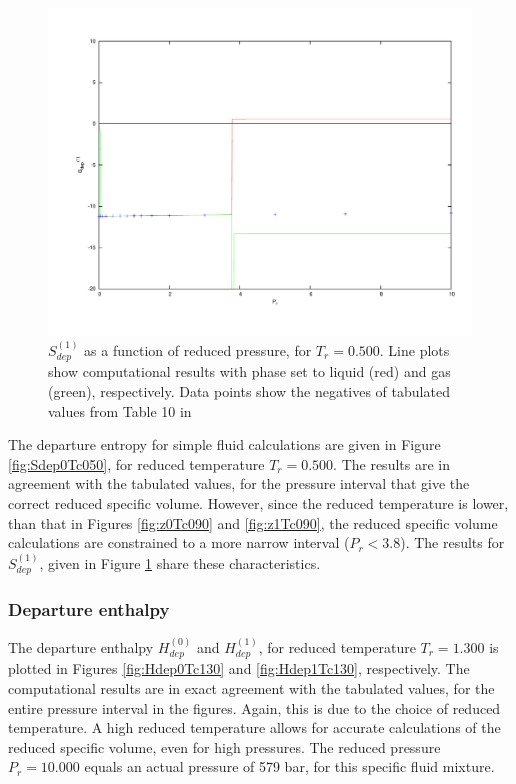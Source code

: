 \documentclass[internal,english]{sintefmemo2012}
\numberwithin{equation}{section}
\begin{document}
\begin{figure}
	\centering
	\includegraphics[trim = 1.5cm 2cm 0 1cm, clip = true, width=14cm]{Sdep1Tc050}
	\caption{$S_{dep}^{(1)}$ as a function of reduced pressure, for $T_r = 0.500$. Line plots show computational results with phase set to liquid (red) and gas (green), respectively. Data points show the negatives of tabulated values from Table 10 in \cite{LK}}
	\label{fig:Sdep1Tc050}
\end{figure}

The departure entropy for simple fluid calculations are given in Figure \ref{fig:Sdep0Tc050}, for reduced temperature $T_r = 0.500$. The results are in agreement with the tabulated values, for the pressure interval that give the correct reduced specific volume. However, since the reduced temperature is lower, than that in Figures \ref{fig:z0Tc090} and \ref{fig:z1Tc090}, the reduced specific volume calculations are constrained to a more narrow interval ($P_r < 3.8$). The results for $S_{dep} ^{(1)}$, given in Figure \ref{fig:Sdep1Tc050} share these characteristics.

\subsubsection*{Departure enthalpy}
The departure enthalpy $H_{dep}^{(0)}$ and  $H_{dep}^{(1)}$, for reduced temperature $T_r = 1.300$ is plotted in Figures \ref{fig:Hdep0Tc130} and \ref{fig:Hdep1Tc130}, respectively. The computational results are in exact agreement with the tabulated values, for the entire pressure interval in the figures. Again, this is due to the choice of reduced temperature. A high reduced temperature allows for accurate calculations of the reduced specific volume, even for high pressures. The reduced pressure $P_r = 10.000$ equals an actual pressure of 579 bar, for this specific fluid mixture.
\end{document}
